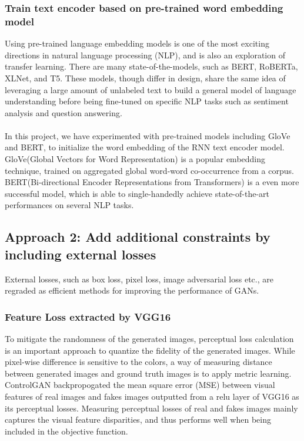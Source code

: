 \documentclass[10pt,twocolumn,letterpaper]{article}
\begin{document}
\subsubsection{Train text encoder based on pre-trained word embedding model}
Using pre-trained language embedding models is one of the most exciting directions in natural language processing (NLP), and is also an exploration of transfer learning. There are many state-of-the-models, such as BERT, RoBERTa, XLNet, and T5. These models, though differ in design, share the same idea of leveraging a large amount of unlabeled text to build a general model of language understanding before being fine-tuned on specific NLP tasks such as sentiment analysis and question answering.
\\\\
In this project, we have experimented with pre-trained  models including GloVe and BERT, to initialize the word embedding of the RNN text encoder model. GloVe(Global Vectors for Word Representation) \cite{pennington2014glove} is a popular embedding technique, trained on aggregated global word-word co-occurrence from a corpus. BERT(Bi-directional Encoder Representations from Transformers) \cite{devlin2018bert} is a even more successful model, which is able to single-handedly achieve state-of-the-art performances on several NLP tasks. 

\subsection{Approach 2: Add additional constraints by including external losses}
\noindent External losses, such as box loss, pixel loss, image adversarial loss etc., are regraded as efficient methods for improving the performance of GANs. 

\subsubsection{Feature Loss extracted by VGG16}
 To mitigate the randomness of the generated images, perceptual loss calculation is an important approach to quantize the fidelity of the generated images. While pixel-wise difference is sensitive to the colors, a way of measuring distance between generated images and ground truth images is to apply metric learning. ControlGAN \cite{li2019controllable} backpropogated the mean square error (MSE) between visual features of real images and fakes images outputted from a relu layer of VGG16 as its perceptual losses.
 Measuring perceptual losses of real and fakes images mainly captures the visual feature disparities, and thus performs well when being included in the objective function.  
 
\end{document}
